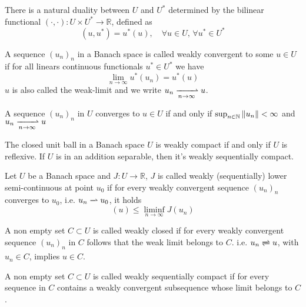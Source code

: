 \begin{remark}
	There is a natural duality between $U$ and $U^*$ determined by the bilinear functional $(\cdot, \cdot): U\times U^*\rightarrow \mathbb{R}$, defined as \[(u, u^*)=u^*(u), \quad \forall u \in U, \, \forall u^* \in U^*\]
\end{remark}

\begin{definition}
	A sequence $(u_n)_n$ in a Banach space is called weakly convergent to some $u\in U$ if for all linears continuous functionals $u^* \in U^*$ we have
	\[
		\lim_{n\rightarrow \infty}u^*(u_n)=u^*(u)
	\]
	$u$ is also called the weak-limit and we write $u_n \xrightharpoonup[n\rightarrow\infty]{} u$.
\end{definition}

\begin{theorem}
	A sequence $(u_n)_n$ in $U$ converges to $u\in U$ if and only if $\sup_{n\in \mathbb{N}} \left\lVert u_n\right\rVert < \infty $ and $u_n \xrightharpoonup[n\rightarrow \infty]{}u$
\end{theorem}
\begin{theorem}
	The closed unit ball in a Banach space $U$ is weakly compact if and only if $U$ is reflexive. If $U$ is in an addition separable, then it's weakly sequentially compact.
\end{theorem}

\begin{definition}
	Let $U$ be a Banach space and $J: U \rightarrow \mathbb{R}$, $J$ is called weakly (sequentially) lower semi-continuous at point $u_0$ if for every weakly convergent sequence $(u_n)_n$ converges to $u_0$, i.e. $u_n \xrightharpoonup[]{} u_0$, it holds \[(u)\leq \liminf_{n\rightarrow \infty} J(u_n)\]
\end{definition}

\begin{definition}
	A non empty set $C\subset U$ is called weakly closed if for every weakly convergent sequence $(u_n)_n$ in $C$ follows that the weak limit belongs to $C$. i.e. $u_n \xrightleftharpoons[]{} u$, with $u_n \in C$, implies $u\in C$.
\end{definition}

\begin{definition}
	A non empty set $C\subset U$ is called weakly sequentially compact if for every sequence in $C$ contains a weakly convergent subsequence whose limit belongs to $C$.
\end{definition}

